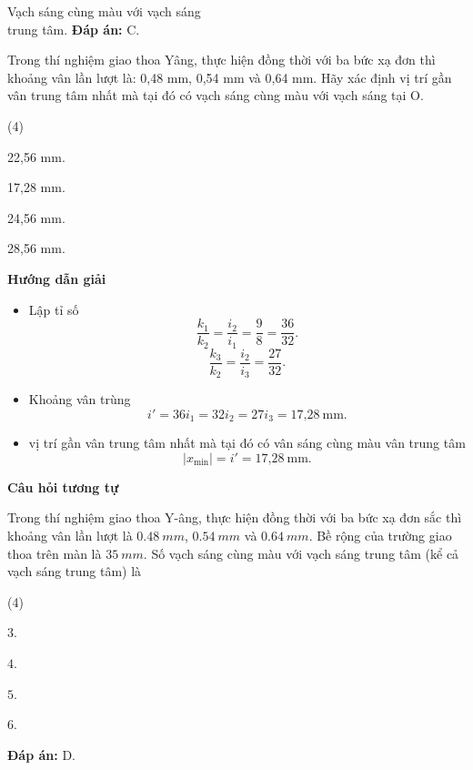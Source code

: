 \begin{dang}{Vạch sáng cùng màu với vạch sáng\\ trung tâm.}
{\textbf{Đáp án:} C.
}
{Trong thí nghiệm giao thoa Yâng, thực hiện đồng thời với ba bức xạ đơn thì khoảng vân lần lượt là: 0,48 mm, 0,54 mm và 0,64 mm. Hãy xác định vị trí gần vân trung tâm nhất mà tại đó có vạch sáng cùng màu với vạch sáng tại O.

\begin{mcq}(4)
	\item 22,56 mm. 		
	\item 17,28 mm. 		
	\item 24,56 mm.  		
	\item 28,56 mm. 
\end{mcq}
}
{\begin{center}
	\textbf{Hướng dẫn giải}
\end{center}
\begin{itemize}
	\item Lập tỉ số
	\begin{equation*}
		\dfrac{k_1}{k_2}=\dfrac{i_2}{i_1}=\dfrac{9}{8}=\dfrac{36}{32}.
	\end{equation*}
	\begin{equation*}
		\dfrac{k_3}{k_2}=\dfrac{i_2}{i_3}=\dfrac{27}{32}.
	\end{equation*}
	\item Khoảng vân trùng
	\begin{equation*}
		i'=36i_1=32i_2=27i_3= \text{17,28}\ \text{mm}.
	\end{equation*}
	\item vị trí gần vân trung tâm nhất mà tại đó có vân sáng cùng màu vân trung tâm
	\begin{equation*}
		|x_{\text{min}}|=i'=\text{17,28}\ \text{mm}.
	\end{equation*}
\end{itemize}

\begin{center}
	\textbf{Câu hỏi tương tự}
\end{center}

Trong thí nghiệm giao thoa Y-âng, thực hiện đồng thời với ba bức xạ đơn sắc thì khoảng vân lần lượt là $ \SI{0,48}{mm} $, $ \SI{0,54}{mm} $ và $ \SI{0,64}{mm} $. Bề rộng của trường giao thoa trên màn là $ \SI{35}{mm} $. Số vạch sáng cùng màu với vạch sáng trung tâm (kể cả vạch sáng trung tâm) là
\begin{mcq}(4)
	\item $ 3 $.
	\item $ 4 $.
	\item $ 5 $.
	\item $ 6 $.
\end{mcq}

\textbf{Đáp án:} D.
}
\end{dang}

	
